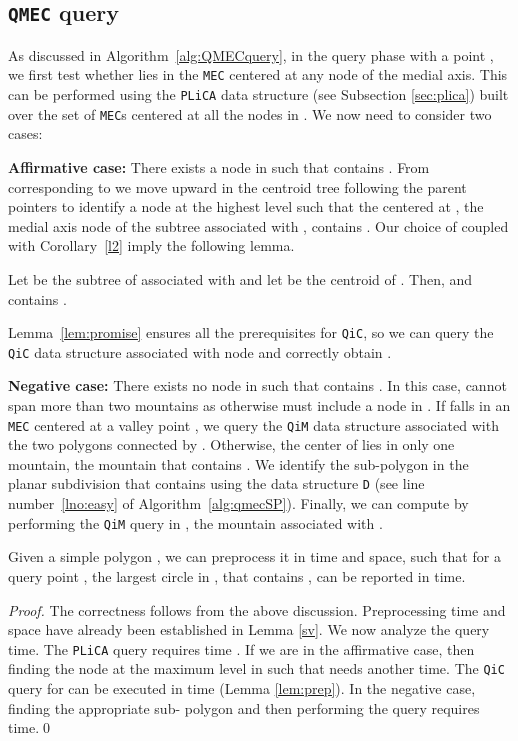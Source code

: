 \documentclass[12pt]{llncs}
\begin{document}
\vspace{-0.2in}
\subsection{{\tt QMEC} query}
As discussed in Algorithm\ \ref{alg:QMECquery}, in the query phase with a point , 
we first test whether  lies in the {\tt MEC} centered at any node  of 
the medial axis. This can be performed using the {\tt PLiCA} data structure 
(see Subsection \ref{sec:plica}) built over the set of {\tt MEC}s centered 
at all the nodes in . We now need to consider two cases:

{\bf Affirmative case:} There exists a node  in  such that  
contains . From  corresponding to  we move upward in the centroid  
tree  following the parent 
pointers to identify a node  at the highest level such that the  
centered at , 
the medial axis node of the subtree associated with , 
contains . Our choice of  coupled with Corollary\ \ref{l2} imply the following 
lemma.
\begin{lemma}\label{lem:promise}
Let  be the subtree of  associated with  and let  be the 
centroid of . 
Then,  and  contains .
\end{lemma}
Lemma\ \ref{lem:promise}  ensures all the prerequisites for {\tt QiC}, so we can query 
the {\tt QiC} data structure associated with  node  and correctly obtain .

{\bf Negative case:} There exists no node  in  such that  
contains . In this case,  cannot span more than two  mountains as 
otherwise  must include a node in . If  falls in an {\tt MEC} centered at a valley point , we 
query the {\tt QiM} data structure associated with the two polygons connected by . 
Otherwise, 
the center of  lies in only one mountain, the mountain that 
contains . We identify the sub-polygon   in the planar subdivision that 
contains  using the data structure {\tt D} (see line number\ \ref{lno:easy} of 
Algorithm\ \ref{alg:qmecSP}). Finally, we can compute 
 by performing the {\tt QiM} query in , the mountain associated with .
 
 
 

\begin{theorem} \label{th:th}
Given a simple polygon , we can preprocess it in  time and 
 space, such that for a query point , the largest circle 
 in , that contains , can be reported in  time. 
\end{theorem}
\begin{proof}
The correctness follows from the above discussion.
Preprocessing time and space have already been established in Lemma \ref{sv}.
We now analyze the  query time. The {\tt PLiCA} query requires  time 
\cite{IIM}. If we are in the affirmative case, then finding the node  
at the maximum level in  such that  needs another 
 time. The {\tt QiC} query for  can be executed in  
time (Lemma \ref{lem:prep}). In the negative case, finding the appropriate sub-
polygon 
and then performing the  query requires  time.\qed
\end{proof}
\end{document}
